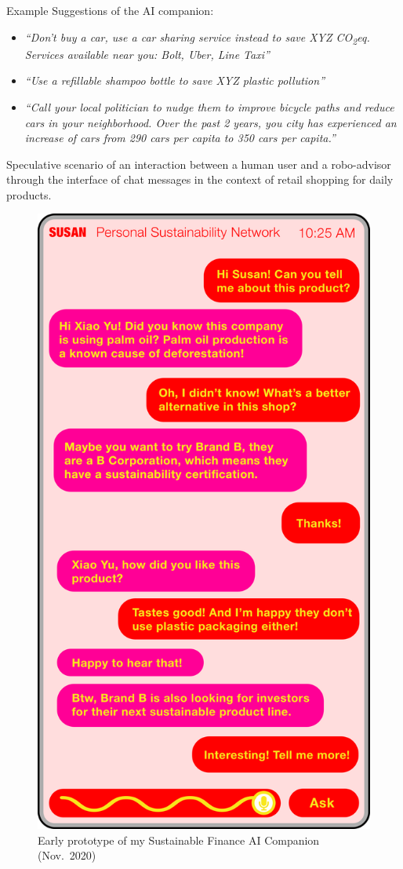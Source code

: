\documentclass[
  12pt,
  letterpaper,
  DIV=11,
  numbers=noendperiod]{scrartcl}
\begin{document}
Example Suggestions of the AI companion:

\begin{itemize}
\item
  \emph{``Don't buy a car, use a car sharing service instead to save XYZ
  CO\textsubscript{2}eq. Services available near you: Bolt, Uber, Line
  Taxi''}
\item
  \emph{``Use a refillable shampoo bottle to save XYZ plastic
  pollution''}
\item
  \emph{``Call your local politician to nudge them to improve bicycle
  paths and reduce cars in your neighborhood. Over the past 2 years, you
  city has experienced an increase of cars from 290 cars per capita to
  350 cars per capita.''}
\end{itemize}

Speculative scenario of an interaction between a human user and a
robo-advisor through the interface of chat messages in the context of
retail shopping for daily products.

\begin{figure}[H]

{\centering \includegraphics[width=0.5\linewidth,height=\textheight,keepaspectratio]{./images/prototypes/susan-pink-app.png}

}

\caption{Early prototype of my Sustainable Finance AI Companion
(Nov.~2020)}

\end{figure}%
\end{document}
